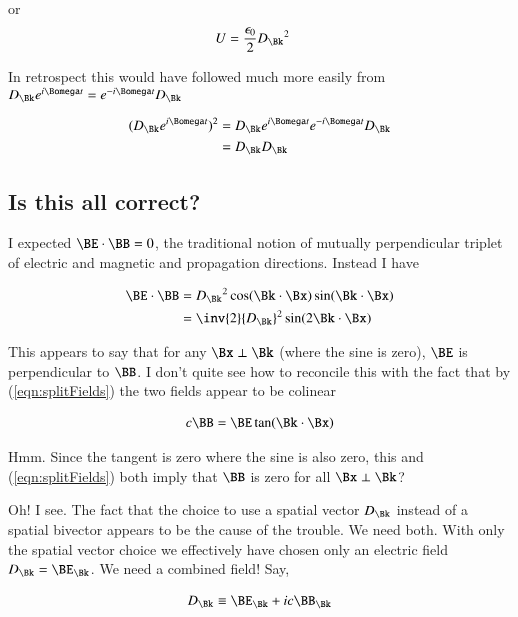 or
\begin{align}
U &= \frac{\epsilon_0}{2} {D_\Bk}^2 
\end{align}

In retrospect this would have followed much more easily from $D_\Bk e^{i\Bomega t} = e^{-i\Bomega t} D_\Bk$

\begin{align*}
(D_\Bk e^{i\Bomega t} )^2
&=
D_\Bk e^{i\Bomega t} e^{-i\Bomega t} D_\Bk \\
&=
D_\Bk D_\Bk \\
\end{align*}

\subsection{Is this all correct?}

I expected $\BE \cdot \BB = 0$, the traditional notion of mutually perpendicular triplet of electric and magnetic and propagation directions.
Instead I have

\begin{align*}
\BE \cdot \BB 
&= {D_\Bk}^2 \cos(\Bk \cdot \Bx) \sin(\Bk \cdot \Bx) \\
&= \inv{2} {D_\Bk}^2 \sin( 2 \Bk \cdot \Bx) 
\end{align*}

This appears to say that for any $\Bx \perp \Bk$ (where the sine is zero), $\BE$ is perpendicular to $\BB$.  I don't quite see how to reconcile this with the fact that by (\ref{eqn:splitFields}) the two fields appear to be colinear

\begin{align}\label{eqn:questionable}
c \BB = \BE \tan(\Bk \cdot \Bx)
\end{align}

Hmm.  Since the tangent is zero where the sine is also zero, this and (\ref{eqn:splitFields}) both imply that $\BB$ is zero for all $\Bx \perp \Bk$?

Oh!  I see.  The fact that the choice to use a spatial vector $D_\Bk$ instead of a spatial bivector appears to be the cause of the trouble.  We need both.  With only the spatial vector choice we effectively have chosen only an electric field $D_\Bk = \BE_\Bk$.  We need a combined field!  Say,

\begin{align}
D_\Bk \equiv \BE_\Bk + i c \BB_\Bk
\end{align}

\EndArticle
